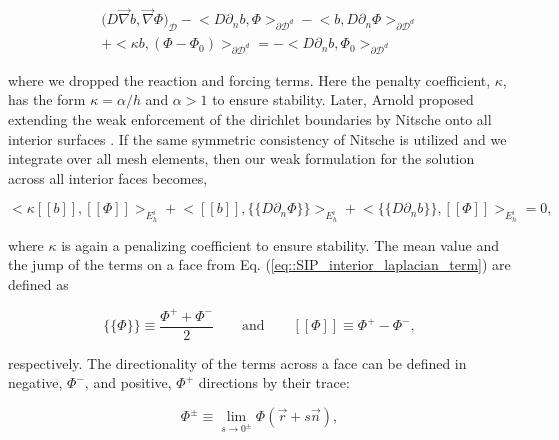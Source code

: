 \begin{equation}
\label{eq::SIP_boundary_laplacian_term}
\begin{aligned}
\Big(  D \vec{\nabla}  b , \vec{\nabla} \Phi  \Big)_{\mathcal{D}} - \Big<   D \partial_n b, \Phi \Big>_{\partial \mathcal{D}^d} - \Big<  b, D \partial_n \Phi \Big>_{\partial \mathcal{D}^d} \\ + \Big< \kappa b,  (\Phi - \Phi_0) \Big>_{\partial \mathcal{D}^d} = - \Big< D \partial_n b ,  \Phi_0 \Big>_{\partial \mathcal{D}^d} 
\end{aligned}
\end{equation}

\noindent where we dropped the reaction and forcing terms. Here the penalty coefficient, $\kappa$, has the form $\kappa = \alpha / h$ and $\alpha > 1$ to ensure stability. Later, Arnold proposed extending the weak enforcement of the dirichlet boundaries by Nitsche onto all interior surfaces \cite{ref::arnold_1982_IP}. If the same symmetric consistency of Nitsche is utilized and we integrate over all mesh elements, then our weak formulation for the solution across all interior faces becomes,

\begin{equation}
\label{eq::SIP_interior_laplacian_term}
\Big< \kappa [\![   b ]\!] , [\![  \Phi ]\!]\Big>_{E_h^i} + \Big<  [\![   b ]\!] , \{\!\{  D \partial_n \Phi \}\!\}\Big>_{E_h^i} + \Big< \{\!\{  D \partial_n  b \}\!\} , [\![  \Phi ]\!]\Big>_{E_h^i} = 0 ,
\end{equation}

\noindent where $\kappa$ is again a penalizing coefficient to ensure stability. The mean value and the jump of the terms on a face from Eq. (\ref{eq::SIP_interior_laplacian_term}) are defined as

\begin{equation}
\label{eq::solution_mean_and_jump}
\{\!\{  \Phi \}\!\} \equiv \frac{\Phi^+ + \Phi^-}{2} \qquad \text{and} \qquad [\![   \Phi ]\!] \equiv \Phi^+ - \Phi^- ,
\end{equation}

\noindent respectively. The directionality of the terms across a face can be defined in negative, $\Phi^-$, and positive, $\Phi^+$ directions by their trace:

\begin{equation}
\label{eq::solution_trace}
\Phi^{\pm} \equiv \lim_{s \rightarrow 0^{\pm}} \Phi (\vec{r} + s \vec{n}),
\end{equation}

